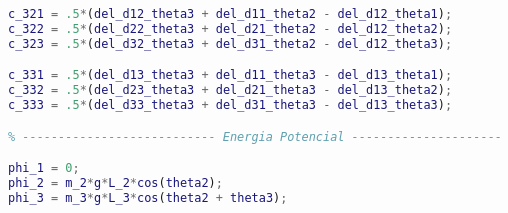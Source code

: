 \begin{anexosenv}
\begin{lstlisting}[language=Matlab]
c_321 = .5*(del_d12_theta3 + del_d11_theta2 - del_d12_theta1);
c_322 = .5*(del_d22_theta3 + del_d21_theta2 - del_d12_theta2);
c_323 = .5*(del_d32_theta3 + del_d31_theta2 - del_d12_theta3);

c_331 = .5*(del_d13_theta3 + del_d11_theta3 - del_d13_theta1);
c_332 = .5*(del_d23_theta3 + del_d21_theta3 - del_d13_theta2);
c_333 = .5*(del_d33_theta3 + del_d31_theta3 - del_d13_theta3);

% --------------------------- Energia Potencial ---------------------

phi_1 = 0;
phi_2 = m_2*g*L_2*cos(theta2);
phi_3 = m_3*g*L_3*cos(theta2 + theta3);

\end{lstlisting}

\end{anexosenv}